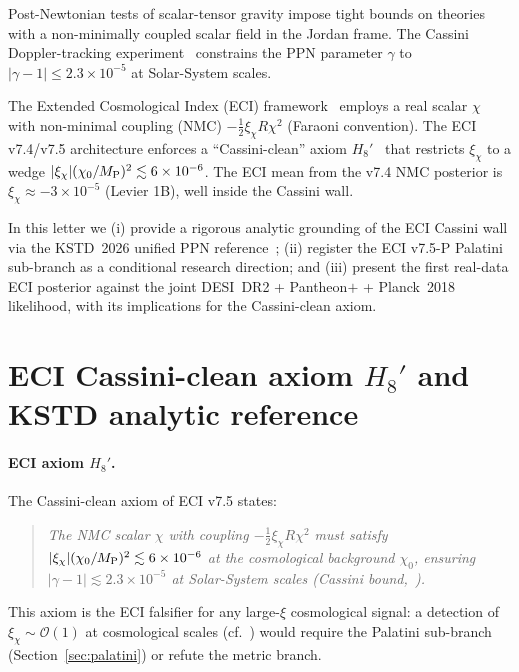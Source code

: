 \documentclass[aps,prl,twocolumn,showpacs,superscriptaddress]{revtex4-2}
\newcommand{\MP}{M_{\rm P}}
\begin{document}
Post-Newtonian tests of scalar-tensor gravity impose tight bounds on
theories with a non-minimally coupled scalar field in the Jordan
frame.  The Cassini Doppler-tracking experiment~\cite{Bertotti03}
constrains the PPN parameter $\gamma$ to
$|\gamma-1| \le 2.3\times 10^{-5}$ at Solar-System scales.

The Extended Cosmological Index (ECI) framework~\cite{ECIv6053}
employs a real scalar $\chi$ with non-minimal coupling (NMC)
$-\tfrac{1}{2}\xi_\chi R\chi^2$ (Faraoni convention).  The ECI
v7.4/v7.5 architecture enforces a ``Cassini-clean'' axiom
$H_8'$~\cite{V74amend} that restricts $\xi_\chi$ to a wedge
$|\xi_\chi|(\chi_0/\MP)^2 \lesssim 6\times 10^{-6}$.  The ECI
mean from the v7.4 NMC posterior is $\xi_\chi \approx -3\times 10^{-5}$
(Levier 1B), well inside the Cassini wall.

In this letter we (i) provide a rigorous analytic grounding of the
ECI Cassini wall via the KSTD~2026 unified PPN reference~\cite{KSTD26};
(ii) register the ECI v7.5-P Palatini sub-branch as a conditional
research direction; and (iii) present the first real-data ECI posterior
against the joint DESI~DR2 + Pantheon$+$ + Planck~2018 likelihood,
with its implications for the Cassini-clean axiom.

\section{ECI Cassini-clean axiom $H_8'$ and KSTD analytic reference}
\label{sec:kstd}

\paragraph{ECI axiom $H_8'$.}
The Cassini-clean axiom of ECI v7.5 states:
\begin{quote}\itshape
The NMC scalar $\chi$ with coupling $-\tfrac{1}{2}\xi_\chi R\chi^2$
must satisfy $|\xi_\chi|(\chi_0/\MP)^2 \lesssim 6\times 10^{-6}$
at the cosmological background $\chi_0$, ensuring
$|\gamma - 1| \lesssim 2.3\times 10^{-5}$ at Solar-System
scales (Cassini bound,~\cite{Bertotti03}).
\end{quote}
This axiom is the ECI falsifier for any large-$\xi$ cosmological
signal: a detection of $\xi_\chi \sim \mathcal{O}(1)$ at
cosmological scales (cf.~\cite{Wolf25}) would require the Palatini
sub-branch (Section~\ref{sec:palatini}) or refute the metric
branch.
\end{document}
